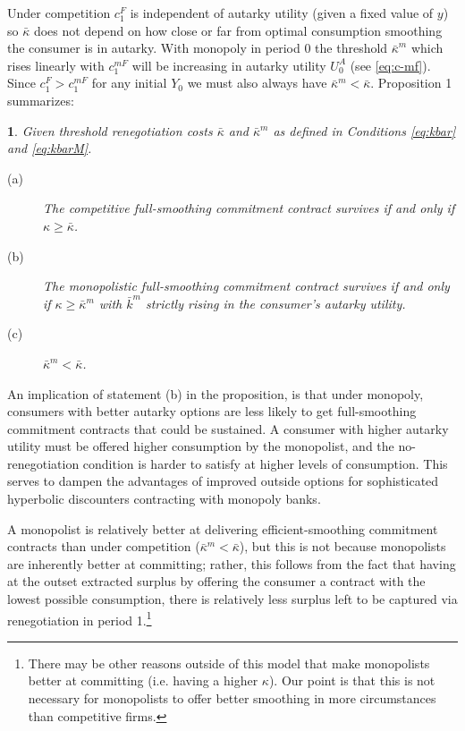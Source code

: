 \documentclass[11pt,english]{article}
\theoremstyle{plain}
\newtheorem{prop}{\protect\propositionname}
\theoremstyle{definition}
\providecommand{\propositionname}{Proposition}
\begin{document}
Under competition $c_{1}^{F}$ is independent of autarky utility (given
a fixed value of $y$) so $\bar{\kappa}$ does not depend on how close
or far from optimal consumption smoothing the consumer is in autarky.
With monopoly in period 0 the threshold $\bar{\kappa}^{m}$ which
rises linearly with $c_{1}^{mF}$ will be increasing in autarky utility
$U_{0}^{A}$ (see \ref{eq:c-mf}). Since $c_{1}^{F}>c_{1}^{mF}$ for
any initial $Y_{0}$ we must also always have $\bar{\kappa}^{m}<\bar{\kappa}$.
Proposition 1 summarizes: 
\begin{prop}
\label{Prop:full-commit} Given threshold renegotiation costs $\bar{\kappa}$
and $\bar{\kappa}^{m}$ as defined in Conditions \ref{eq:kbar} and
\ref{eq:kbarM}. 
\begin{description}
\item [{(a)}] The competitive full-smoothing commitment contract survives
if and only if $\kappa\geq$$\bar{\kappa}$. 
\item [{(b)}] The monopolistic full-smoothing commitment contract survives
if and only if $\kappa\geq$$\bar{\kappa}^{m}$ with $\bar{k}^{m}$
strictly rising in the consumer's autarky utility. 
\item [{(c)}] $\bar{\kappa}^{m}<\bar{\kappa}$. 
\end{description}
\end{prop}
An implication of statement (b) in the proposition, is that under
monopoly, consumers with better autarky options are less likely to
get full-smoothing commitment contracts that could be sustained. A
consumer with higher autarky utility must be offered higher consumption
by the monopolist, and the no-renegotiation condition is harder to
satisfy at higher levels of consumption. This serves to dampen the
advantages of improved outside options for sophisticated hyperbolic
discounters contracting with monopoly banks.

A monopolist is relatively better at delivering efficient-smoothing
commitment contracts than under competition ($\bar{\kappa}^{m}<\bar{\kappa}$),
but this is not because monopolists are inherently better at committing;
rather, this follows from the fact that having at the outset extracted
surplus by offering the consumer a contract with the lowest possible
consumption, there is relatively less surplus left to be captured
via renegotiation in period 1.\footnote{There may be other reasons outside of this model that make monopolists
better at committing (i.e. having a higher $\kappa$). Our point is
that this is not necessary for monopolists to offer better smoothing
in more circumstances than competitive firms.}
\end{document}
